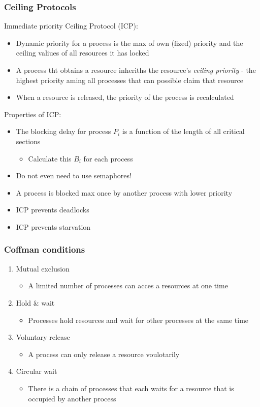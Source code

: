 \documentclass[course, english]{Notes}
\begin{document}
\subsubsection{Ceiling Protocols}
Immediate priority Ceiling Protocol (ICP):
\begin{itemize}
	\item Dynamic priority for a process is the max of own (fized) priority
		and the ceiling valiues of all resources it has locked
	\item A process tht obtains a resource inheriths the resource's
		\textit{ceiling
		priority} - the highest priority aming all processes that can
		possible claim that resource
	\item When a resource is released, the priority of the process is
		recalculated
\end{itemize}
Properties of ICP:
\begin{itemize}
	\item The blocking delay for process $P_i$ is a function of the length of all critical sections
		\begin{itemize}
			\item Calculate this $B_i$ for each process
		\end{itemize}
	\item Do not even need to use semaphores!
	\item A process is blocked max once by another process with lower
		priority
	\item ICP prevents deadlocks
	\item ICP prevents starvation
\end{itemize}

\subsubsection{Coffman conditions}
\begin{enumerate}
	\item Mutual exclusion
		\begin{itemize}
			\item A limited number of processes can acces a
				resources at one time
		\end{itemize}
	\item Hold \& wait
		\begin{itemize}
			\item Processes hold resources and wait for other
				processes at the same time
		\end{itemize}
	\item Voluntary release
		\begin{itemize}
			\item A process can only release a resource voulotarily
		\end{itemize}
	\item Circular wait
		\begin{itemize}
			\item There is a chain of processes that each waits for
				a resource that is occupied by another process
		\end{itemize}
\end{enumerate}
\end{document}
